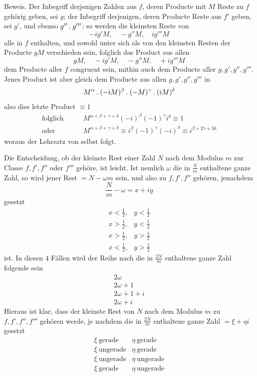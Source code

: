 %
Beweis. Der Inbegriff derjenigen Zahlen aus $f$, deren Producte mit $M$ Reste zu $f$ gehörig geben, sei $g$; der Inbegriff derjenigen, deren Producte Reste aus $f'$ geben, sei $g'$, und ebenso $g''\mathbin{.} g'''$; so werden die kleinsten Reste von
\[
-ig'M,\quad -g''M,\quad ig'''M
\]
alle in $f$ enthalten, und sowohl unter sich als von den kleinsten Resten der Producte $gM$ verschieden sein, folglich das Product aus allen
\[
gM,\quad -ig'M,\quad -g''M,\quad +ig'''M
\]
dem Producte aller $f$ congruent sein, mithin auch dem Producte aller $g,g',g'',g'''$. Jenes Product ist aber gleich dem Producte aus allen $g,g',g'',g'''$ in
\[
M^{\alpha}\mathbin{.}(-iM)^{\beta}\mathbin{.}(-M)^{\gamma}\mathbin{.}(iM)^{\delta}
\]
also dies letzte Product $\equiv1$
\[
\begin{aligned}
\text{folglich}\qquad&M^{\alpha+\beta+\gamma+\delta}(-i)^{\beta}(-1)^{\gamma}i^{\delta}\equiv1\\
\text{oder}\qquad&M^{\alpha+\beta+\gamma+\delta}\equiv i^{\beta}(-1)^{\gamma}(-i)^{\delta}\equiv i^{\beta+2\gamma+3\delta}
\end{aligned}
\]
woraus der Lehrsatz von selbst folgt.

Die Entscheidung, ob der kleinste Rest einer Zahl $N$ nach dem Modulus $m$ zur Classe $f,f',f''$ oder $f'''$ gehöre, ist leicht. Ist nemlich $\omega$ die in $\frac{N}{m}$ enthaltene ganze Zahl, so wird jener Rest $=N-\omega m$ sein, und also zu $f,f',f''$ gehören, jenachdem
\[
\frac{N}{m}-\omega=x+iy
\]
gesetzt
\[
\begin{array}{ll}
x<\tfrac12,&y<\tfrac12\\
x>\tfrac12,&y<\tfrac12\\
x>\tfrac12,&y>\tfrac12\\
x<\tfrac12,&y>\tfrac12
\end{array}
\]
ist. In diesen $4$ Fällen wird der Reihe nach die in $\frac{2N}{m}$ enthaltene ganze Zahl folgende sein
%
\[
\begin{array}{l}
2\omega\\
2\omega+1\\
2\omega+1+i\\
2\omega+i
\end{array}
\]
Hieraus ist klar, dass der kleinste Rest von $N$ nach dem Modulus $m$ zu $f,f',f'',f'''$ gehören werde, je nachdem die in $\frac{2N}{m}$ enthaltene ganze Zahl $=\xi+\eta i$ gesetzt
\[
\begin{array}{ll}
\xi\ \text{gerade}&\eta\ \text{gerade}\\
\xi\ \text{ungerade}&\eta\ \text{gerade}\\
\xi\ \text{ungerade}&\eta\ \text{ungerade}\\
\xi\ \text{gerade}&\eta\ \text{ungerade}
\end{array}
\]

